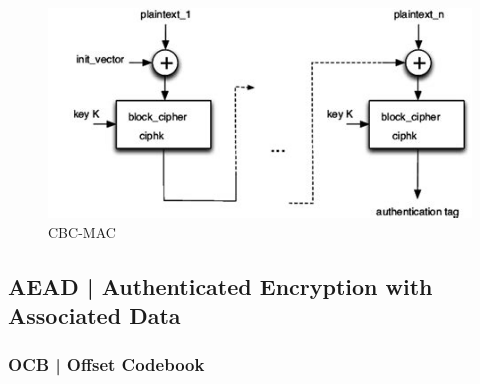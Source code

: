 \begin{figure}[H]
	\centering
	\includegraphics[width=.9\textwidth, height=.9\textheight, keepaspectratio]{./images/aes_modes/cbc-mac}
	\caption{CBC-MAC}
	\label{fig:cbc-mac}
\end{figure}


\subsection{AEAD | Authenticated Encryption with Associated Data}


\textsf{\small }

\subsubsection{OCB | Offset Codebook} %






